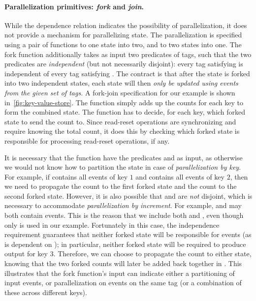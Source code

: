 \paragraph{Parallelization primitives: \emph{fork} and \emph{join}.}
\label{p:fork-join}
%
While the dependence relation indicates the possibility of
parallelization, it does not provide a mechanism for parallelizing
state.  The parallelization is specified using a pair of functions to 
one state into two, and to  two states into one.
The
fork function additionally takes as input two predicates of tags,
such that the two predicates are \emph{independent} (but not necessarily disjoint):
every tag satisfying  is independent of every tag satisfying .
The
contract is that after the state is forked into two independent
states, each state will then \emph{only be updated using events from
the given set of tags.}
A fork-join specification for our example
is shown in~\cref{fig:key-value-store}.
The  function simply adds up the counts for each key to form the combined
state. The  function has to decide, for each key, which forked state
to send the count to.
Since read-reset operations  are synchronizing and require knowing the total count,
it does this by checking
which forked state is responsible for processing read-reset
operations, if any.

It is necessary that the  function
have the predicates  and  as input,
as otherwise we would not know how to partition the state 
in case of \emph{parallelization by key}.
For example, if  contains all events of key $1$
and  contains all events of key $2$,
then we need to propagate the count  to the first forked state
and the count  to the second forked state.
However, it is also possible that  and 
are \emph{not} disjoint,
which is necessary to accommodate \emph{parallelization by increment}.
For example,  and  may both contain 
events.
This is the reason that we include both  and ,
even though only  is used in our example.
Fortunately in this case, the independence requirement
guarantees that neither forked state will be responsible for
 events (as  is dependent on );
in particular, neither forked state will be required to produce output for key $3$.
Therefore, we can choose to propagate the count  to either state,
knowing that the two forked counts will later be added back together in .
This illustrates that the fork function's input can indicate either
a partitioning of input events, or parallelization on events on the same tag
(or a combination of these across different keys).


